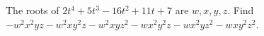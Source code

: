 The roots of $2t^4+5t^3-16t^2+11t+7$ are $w,x,y,z$. Find $-w^2x^2yz-w^2xy^2z-w^2xyz^2-wx^2y^2z-wx^2yz^2-wxy^2z^2$.
